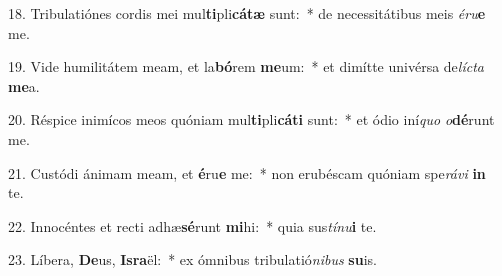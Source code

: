 18. Tribulatiónes cordis mei mul\textbf{ti}pli\textbf{cá}\textbf{tæ} sunt:~*  de necessitátibus meis \textit{é}\textit{ru}\textbf{e} me.\

19. Vide humilitátem meam, et la\textbf{bó}rem \textbf{me}um:~*  et dimítte univérsa de\textit{líc}\textit{ta} \textbf{me}a.\

20. Réspice inimícos meos quóniam mul\textbf{ti}pli\textbf{cá}\textbf{ti} sunt:~*  et ódio iní\textit{quo} \textit{o}\textbf{dé}runt me.\

21. Custódi ánimam meam, et \textbf{é}ru\textbf{e} me:~*  non erubéscam quóniam spe\textit{rá}\textit{vi} \textbf{in} te.\

22. Innocéntes et recti adhæ\textbf{sé}runt \textbf{mi}hi:~*  quia sus\textit{tí}\textit{nu}\textbf{i} te.\

23. Líbera, \textbf{De}us, \textbf{Is}\textbf{ra}ël:~*  ex ómnibus tribulatió\textit{ni}\textit{bus} \textbf{su}is.\

